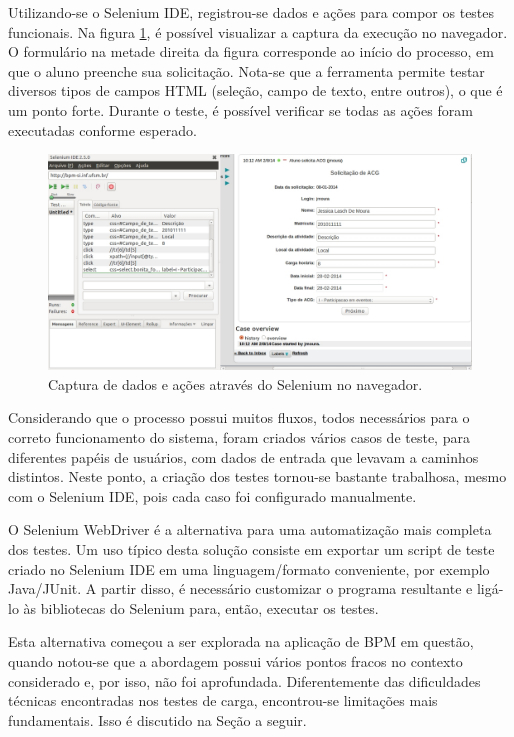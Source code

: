 \documentclass[12pt]{article}
\begin{document}
Utilizando-se o Selenium IDE, registrou-se dados e ações para compor os testes funcionais. Na figura \ref{fig:capturaselenium}, é possível visualizar a captura da execução no navegador. O formulário na metade direita da figura corresponde ao início do processo, em que o aluno preenche sua solicitação. Nota-se que a ferramenta permite testar diversos tipos de campos HTML (seleção, campo de texto, entre outros), o que é um ponto forte. Durante o teste, é possível verificar se todas as ações foram executadas conforme esperado.




\begin{figure}[ht]
\centering
\includegraphics[width=.99\textwidth]{imagens/capturaselenium.jpg}
\caption{Captura de dados e ações através do Selenium no navegador.}
\label{fig:capturaselenium}
\end{figure}


Considerando que o processo possui muitos fluxos, todos necessários para o correto funcionamento do sistema, foram criados vários casos de teste, para diferentes papéis de usuários, com dados de entrada que levavam a caminhos distintos. Neste ponto, a criação dos testes tornou-se bastante trabalhosa, mesmo com o Selenium IDE, pois cada caso foi configurado manualmente.


O Selenium WebDriver é a alternativa para uma automatização mais completa dos testes. Um uso típico desta solução consiste em exportar um script de teste criado no Selenium IDE em uma linguagem/formato conveniente, por exemplo Java/JUnit. A partir disso, é necessário customizar o programa resultante e ligá-lo às bibliotecas do Selenium para, então, executar os testes.


Esta alternativa começou a ser explorada na aplicação de BPM em questão, quando notou-se que a abordagem possui vários pontos fracos no contexto considerado e, por isso, não foi aprofundada. Diferentemente das dificuldades técnicas encontradas nos testes de carga, encontrou-se limitações mais fundamentais. Isso é discutido na Seção a seguir.
\end{document}
